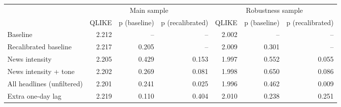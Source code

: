 \begin{tabular}{lrrrrrr}
\toprule
 & \multicolumn{3}{c}{Main sample} & \multicolumn{3}{c}{Robustness sample} \\
 & QLIKE & p (baseline) & p (recalibrated) & QLIKE & p (baseline) & p (recalibrated) \\
\midrule
Baseline & 2.212 & -- & -- & 2.002 & -- & -- \\
Recalibrated baseline & 2.217 & 0.205 & -- & 2.009 & 0.301 & -- \\
News intensity & 2.205 & 0.429 & 0.153 & 1.997 & 0.552 & 0.055 \\
News intensity + tone & 2.202 & 0.269 & 0.081 & 1.998 & 0.650 & 0.086 \\
All headlines (unfiltered) & 2.201 & 0.241 & 0.025 & 1.996 & 0.462 & 0.009 \\
Extra one-day lag & 2.219 & 0.110 & 0.404 & 2.010 & 0.238 & 0.251 \\
\bottomrule
\end{tabular}
